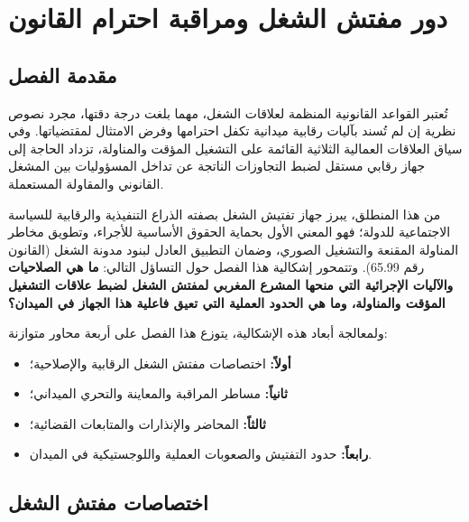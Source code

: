 
\chapter{دور مفتش الشغل ومراقبة احترام القانون}
\label{chap:chapitre6}

\section*{مقدمة الفصل}

تُعتبر القواعد القانونية المنظمة لعلاقات الشغل، مهما بلغت درجة دقتها، مجرد نصوص نظرية إن لم تُسند بآليات رقابية ميدانية تكفل احترامها وفرض الامتثال لمقتضياتها. وفي سياق العلاقات العمالية الثلاثية القائمة على التشغيل المؤقت والمناولة، تزداد الحاجة إلى جهاز رقابي مستقل لضبط التجاوزات الناتجة عن تداخل المسؤوليات بين المشغل القانوني والمقاولة المستعملة.

من هذا المنطلق، يبرز جهاز تفتيش الشغل بصفته الذراع التنفيذية والرقابية للسياسة الاجتماعية للدولة؛ فهو المعني الأول بحماية الحقوق الأساسية للأجراء، وتطويق مخاطر المناولة المقنعة والتشغيل الصوري، وضمان التطبيق العادل لبنود مدونة الشغل (القانون رقم \textenglish{65.99}). وتتمحور إشكالية هذا الفصل حول التساؤل التالي: \textbf{ما هي الصلاحيات والآليات الإجرائية التي منحها المشرع المغربي لمفتش الشغل لضبط علاقات التشغيل المؤقت والمناولة، وما هي الحدود العملية التي تعيق فاعلية هذا الجهاز في الميدان؟}

ولمعالجة أبعاد هذه الإشكالية، يتوزع هذا الفصل على أربعة محاور متوازنة:
\begin{itemize}[leftmargin=*, itemsep=4pt]
    \item \textbf{أولاً:} اختصاصات مفتش الشغل الرقابية والإصلاحية؛
    \item \textbf{ثانياً:} مساطر المراقبة والمعاينة والتحري الميداني؛
    \item \textbf{ثالثاً:} المحاضر والإنذارات والمتابعات القضائية؛
    \item \textbf{رابعاً:} حدود التفتيش والصعوبات العملية واللوجستيكية في الميدان.
\end{itemize}

\section{اختصاصات مفتش الشغل}

